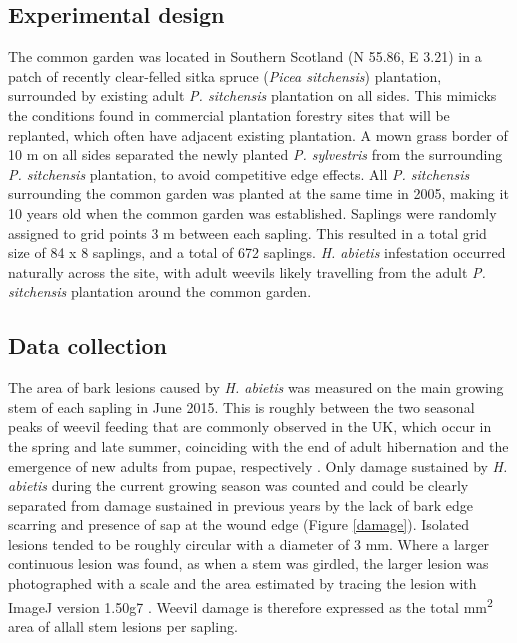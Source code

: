 \documentclass[a4paper, 11pt]{article}
\newcommand{\textapprox}{\raisebox{0.5ex}{\texttildelow}}
\newcommand{\todo}[1]{\textcolor{red}{#1}}   %
\begin{document}
\subsection*{Experimental design}

The common garden was located in Southern Scotland (N 55.86\textdegree{}, E \textminus{}3.21\textdegree{}) in a patch of recently clear-felled sitka spruce (\textit{Picea sitchensis}) plantation, surrounded by existing adult \textit{P. sitchensis} plantation on all sides. This mimicks the conditions found in commercial plantation forestry sites that will be replanted, which often have adjacent existing plantation. A mown grass border of 10 m on all sides separated the newly planted \textit{P. sylvestris} from the surrounding \textit{P. sitchensis} plantation, to avoid competitive edge effects. All \textit{P. sitchensis} surrounding the common garden was planted at the same time in 2005, making it 10 years old when the common garden was established. %
Saplings were randomly assigned to grid points 3 m between each sapling. This resulted in a total grid size of 84 x 8 saplings, and a total of 672 saplings. \textit{H. abietis} infestation occurred naturally across the site, with adult weevils likely travelling from the adult \textit{P. sitchensis} plantation around the common garden. 

\subsection*{Data collection}

The area of bark lesions caused by \textit{H. abietis} was measured on the main growing stem of each sapling in June 2015. This is roughly between the two seasonal peaks of weevil feeding that are commonly observed in the UK, which occur in the spring and late summer, coinciding with the end of adult hibernation and the emergence of new adults from pupae, respectively \citep{Nordenhem1989, Leather1999}. Only damage sustained by \textit{H. abietis} during the current growing season was counted and could be clearly separated from damage sustained in previous years by the lack of bark edge scarring and presence of sap at the wound edge (Figure \ref{damage}). Isolated lesions tended to be roughly circular with a diameter of \textapprox{}3 mm. Where a larger continuous lesion was found, as when a stem was girdled, the larger lesion was photographed with a scale and the area estimated by tracing the lesion with ImageJ version 1.50g7 \citep{Schneider2012}. Weevil damage is therefore expressed as the total mm\textsuperscript{2} area of allall  stem lesions per sapling. 
\end{document}
